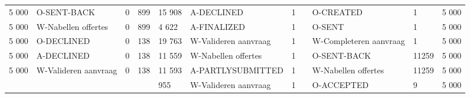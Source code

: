 \begin{tabular}{lllllllllll}
5 000 & O-SENT-BACK & 0 & 899 & 15 908 & A-DECLINED & 1 &  & O-CREATED & 1 & 5 000 \\
5 000 & W-Nabellen offertes & 0 & 899 & 4 622 & A-FINALIZED & 1 &  & O-SENT & 1 & 5 000 \\
5 000 & O-DECLINED & 0 & 138 & 19 763 & W-Valideren aanvraag & 1 &  & W-Completeren aanvraag & 1 & 5 000 \\
5 000 & A-DECLINED & 0 & 138 & 11 559 & W-Nabellen offertes & 1 &  & O-SENT-BACK & 11259 & 5 000 \\
5 000 & W-Valideren aanvraag & 0 & 138 & 11 593 & A-PARTLYSUBMITTED & 1 &  & W-Nabellen offertes & 11259 & 5 000 \\
 &  &  &  & 955 & W-Valideren aanvraag & 1 &  & O-ACCEPTED & 9 & 5 000 \\
\bottomrule
\end{tabular}
